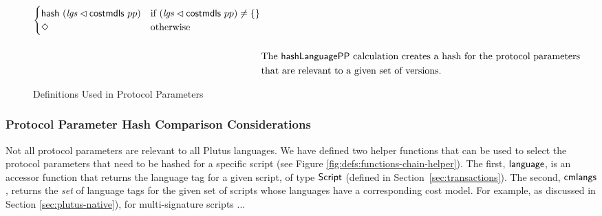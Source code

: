 \begin{figure*}[htb]
\begin{align*}
\begin{cases}
         \mathsf{hash}~(\mathit{lgs} \lhd \mathsf{costmdls}~{pp})
                           & \text{if~} (\mathit{lgs} \lhd \mathsf{costmdls}~{pp}) \neq \{\} \\
              \Diamond & \text{otherwise} \\
      \end{cases} \\[3ex]
    & \text{The $\mathsf{hashLanguagePP}$ calculation creates a hash for the protocol parameters} \\ & \text{that are relevant to
    a given set of versions.}
  \end{align*}
  \caption{Definitions Used in Protocol Parameters}
  \label{fig:defs:protocol-parameters}
\end{figure*}

\subsubsection{Protocol Parameter Hash Comparison Considerations}


Not all protocol parameters are relevant to all Plutus languages.
We have defined two helper functions that can be used to select the protocol parameters that need to be hashed for a specific script
(see Figure \ref{fig:defs:functions-chain-helper}). The first, $\mathsf{language}$, is an accessor function that returns the language tag for a given script, of type
$\mathsf{Script}$ (defined in Section~\ref{sec:transactions}).
The second, $\mathsf{cmlangs}$, returns the \emph{set} of language tags for the given set of scripts whose languages have a corresponding cost model.
For example, as discussed in Section \ref{sec:plutus-native}),
for multi-signature scripts ...

